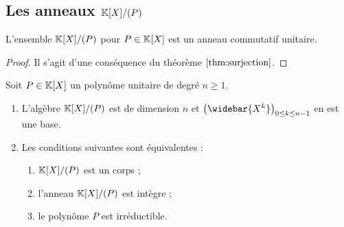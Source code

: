 \subsection{Les anneaux $\mathbb{K}[X]/(P)$}

\begin{thm}
L'ensemble $\mathbb{K}[X]/(P)$ pour $P \in \mathbb{K}[X]$ est un anneau commutatif unitaire. 
\end{thm}

\begin{proof}
Il s'agit d'une conséquence du théorème $\ref{thm:surjection}$.
\end{proof}

\begin{thm}
\label{thm:algbrKsP}
Soit $P \in \mathbb{K}[X]$ un polynôme unitaire de degré $n \geq 1$. 
\begin{enumerate}
\item L'algèbre $\mathbb{K}[X]/(P)$ est de dimension $n$ et $\bigpar{\widebar{X^k}}_{0 \leq k \leq n-1}$ en est une base.
\item Les conditions suivantes sont équivalentes :
	\begin{enumerate}[label=(\alph*)]
	\item $\mathbb{K}[X]/(P)$ est un corps ;
	\item l'anneau $\mathbb{K}[X]/(P)$ est intègre ;
	\item le polynôme $P$ est irréductible.
	\end{enumerate}
\end{enumerate}
\end{thm}


